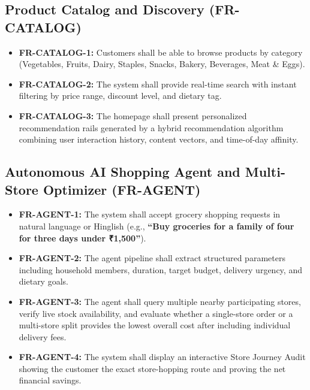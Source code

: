 \subsection{Product Catalog and Discovery (FR-CATALOG)}
\begin{itemize}
    \item \textbf{FR-CATALOG-1:} Customers shall be able to browse products by category (Vegetables, Fruits, Dairy, Staples, Snacks, Bakery, Beverages, Meat \& Eggs).
    \item \textbf{FR-CATALOG-2:} The system shall provide real-time search with instant filtering by price range, discount level, and dietary tag.
    \item \textbf{FR-CATALOG-3:} The homepage shall present personalized recommendation rails generated by a hybrid recommendation algorithm combining user interaction history, content vectors, and time-of-day affinity.
\end{itemize}

\subsection{Autonomous AI Shopping Agent and Multi-Store Optimizer (FR-AGENT)}
\begin{itemize}
    \item \textbf{FR-AGENT-1:} The system shall accept grocery shopping requests in natural language or Hinglish (e.g., \textbf{``Buy groceries for a family of four for three days under ₹1,500''}).
    \item \textbf{FR-AGENT-2:} The agent pipeline shall extract structured parameters including household members, duration, target budget, delivery urgency, and dietary goals.
    \item \textbf{FR-AGENT-3:} The agent shall query multiple nearby participating stores, verify live stock availability, and evaluate whether a single-store order or a multi-store split provides the lowest overall cost after including individual delivery fees.
    \item \textbf{FR-AGENT-4:} The system shall display an interactive Store Journey Audit showing the customer the exact store-hopping route and proving the net financial savings.
\end{itemize}

